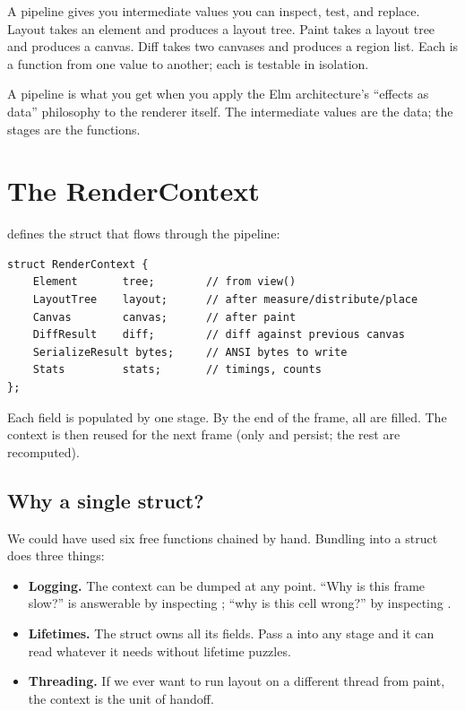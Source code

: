 A pipeline gives you intermediate values you can inspect, test,
and replace. Layout takes an element and produces a layout tree.
Paint takes a layout tree and produces a canvas. Diff takes two
canvases and produces a region list. Each is a function from one
value to another; each is testable in isolation.

\begin{idea}
A pipeline is what you get when you apply the Elm architecture's
``effects as data'' philosophy to the renderer itself. The
intermediate values are the data; the stages are the functions.
\end{idea}

\section{The RenderContext}

 defines the
struct that flows through the pipeline:

\begin{lstlisting}
struct RenderContext {
    Element       tree;        // from view()
    LayoutTree    layout;      // after measure/distribute/place
    Canvas        canvas;      // after paint
    DiffResult    diff;        // diff against previous canvas
    SerializeResult bytes;     // ANSI bytes to write
    Stats         stats;       // timings, counts
};
\end{lstlisting}

Each field is populated by one stage. By the end of the frame,
all are filled. The context is then reused for the next frame
(only  and  persist; the rest are
recomputed).

\subsection*{Why a single struct?}

We could have used six free functions chained by hand. Bundling
into a struct does three things:

\begin{itemize}[leftmargin=*]
  \item \textbf{Logging.} The context can be dumped at any
    point. ``Why is this frame slow?'' is answerable by
    inspecting ; ``why is this cell wrong?'' by
    inspecting .
  \item \textbf{Lifetimes.} The struct owns all its fields. Pass
    a  into any stage and it can
    read whatever it needs without lifetime puzzles.
  \item \textbf{Threading.} If we ever want to run layout on a
    different thread from paint, the context is the unit of
    handoff.
\end{itemize}

